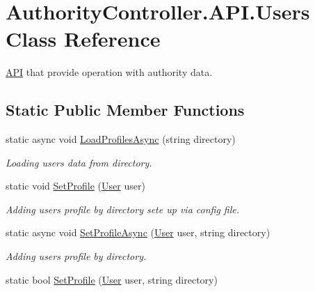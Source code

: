 \hypertarget{class_authority_controller_1_1_a_p_i_1_1_users}{}\section{Authority\+Controller.\+A\+P\+I.\+Users Class Reference}
\label{class_authority_controller_1_1_a_p_i_1_1_users}


\mbox{\hyperlink{namespace_authority_controller_1_1_a_p_i}{A\+PI}} that provide operation with authority data.  


\subsection*{Static Public Member Functions}
\begin{DoxyCompactItemize}
\item 
static async void \mbox{\hyperlink{class_authority_controller_1_1_a_p_i_1_1_users_a5154a7787617e9c51c5519304ec89530}{Load\+Profiles\+Async}} (string directory)
\begin{DoxyCompactList}\small\item\em Loading users data from directory. \end{DoxyCompactList}\item 
static void \mbox{\hyperlink{class_authority_controller_1_1_a_p_i_1_1_users_a5d8242dfe20d058ea78d9f50b3b3c3cd}{Set\+Profile}} (\mbox{\hyperlink{class_authority_controller_1_1_data_1_1_personal_1_1_user}{User}} user)
\begin{DoxyCompactList}\small\item\em Adding user\textquotesingle{}s profile by directory sete up via config file. \end{DoxyCompactList}\item 
static async void \mbox{\hyperlink{class_authority_controller_1_1_a_p_i_1_1_users_a3ed2ca9e5bb026c907894da4160b5e5e}{Set\+Profile\+Async}} (\mbox{\hyperlink{class_authority_controller_1_1_data_1_1_personal_1_1_user}{User}} user, string directory)
\begin{DoxyCompactList}\small\item\em Adding user\textquotesingle{}s profile by directory. \end{DoxyCompactList}\item 
static bool \mbox{\hyperlink{class_authority_controller_1_1_a_p_i_1_1_users_a6896c020fbcaf19c54962c7c769502e4}{Set\+Profile}} (\mbox{\hyperlink{class_authority_controller_1_1_data_1_1_personal_1_1_user}{User}} user, string directory)

\end{DoxyCompactItemize}
